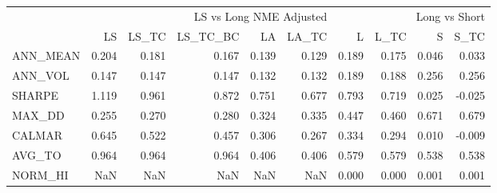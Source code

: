 \begin{tabular}{lrrrrrrrrr}
\toprule
 & \multicolumn{5}{r}{LS vs Long NME Adjusted} & \multicolumn{4}{r}{Long vs Short} \\
 & LS & LS\_TC & LS\_TC\_BC & LA & LA\_TC & L & L\_TC & S & S\_TC \\
\midrule
ANN\_MEAN & 0.204 & 0.181 & 0.167 & 0.139 & 0.129 & 0.189 & 0.175 & 0.046 & 0.033 \\
ANN\_VOL & 0.147 & 0.147 & 0.147 & 0.132 & 0.132 & 0.189 & 0.188 & 0.256 & 0.256 \\
SHARPE & 1.119 & 0.961 & 0.872 & 0.751 & 0.677 & 0.793 & 0.719 & 0.025 & -0.025 \\
MAX\_DD & 0.255 & 0.270 & 0.280 & 0.324 & 0.335 & 0.447 & 0.460 & 0.671 & 0.679 \\
CALMAR & 0.645 & 0.522 & 0.457 & 0.306 & 0.267 & 0.334 & 0.294 & 0.010 & -0.009 \\
AVG\_TO & 0.964 & 0.964 & 0.964 & 0.406 & 0.406 & 0.579 & 0.579 & 0.538 & 0.538 \\
NORM\_HI & NaN & NaN & NaN & NaN & NaN & 0.000 & 0.000 & 0.001 & 0.001 \\
\bottomrule
\end{tabular}
